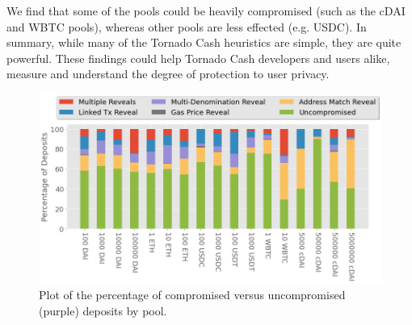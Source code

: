 We find that some of the pools could be heavily compromised (such as the cDAI and WBTC pools), whereas other pools are less effected (e.g. USDC). In summary, while many of the Tornado Cash heuristics are simple, they are quite powerful. These findings could help Tornado Cash developers and users alike, measure and understand the degree of protection to user privacy.

\begin{figure}[h!]
\includegraphics[width=\linewidth]{figures/tornado_graph.png}
\caption{Plot of the percentage of compromised versus uncompromised (purple) deposits by pool. }
\label{fig:tcashgraph}
\end{figure}